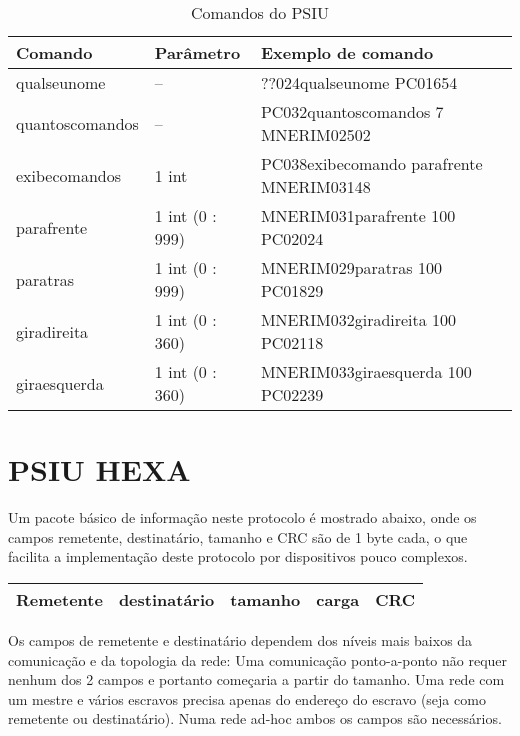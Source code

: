 \documentclass[11pt,	 papera4]{article}
\begin{document}
\begin{table}[h]
	\centering
	\caption{Comandos do PSIU}
	\begin{tabular}{p{3cm}p{2.5cm}p{9cm}}
		\toprule
		Comando &  Parâmetro & Exemplo de comando \\
		\midrule	
		qualseunome & -- & 	??024qualseunome PC01654\\	
		quantoscomandos & -- & PC032quantoscomandos 7 MNERIM02502  \\
		exibecomandos & 1 int & PC038exibecomando parafrente MNERIM03148\\
		parafrente & 1 int (0 : 999)  & MNERIM031parafrente 100 PC02024 \\
		paratras & 1 int (0 : 999)  & MNERIM029paratras 100 PC01829 \\
		giradireita & 1 int (0 : 360)  & MNERIM032giradireita 100 PC02118 \\
		giraesquerda & 1 int (0 : 360)  & MNERIM033giraesquerda 100 PC02239 \\
		\bottomrule
	\end{tabular}
	\label{tab:formatoslatex} %
\end{table}
	
\newpage

\part*{PSIU HEXA}


Um pacote básico de informação neste protocolo é mostrado abaixo, onde os campos remetente, destinatário, tamanho e CRC são de 1 byte cada, o que facilita a implementação deste protocolo por dispositivos pouco complexos.


\begin{center}
\begin{tabular}{lllll}
\hline
 Remetente  &  destinatário  &  tamanho  &  carga  &  CRC  \\
\hline
\end{tabular}
\end{center}



Os campos de remetente e destinatário dependem dos níveis mais baixos da comunicação e da topologia da rede: Uma comunicação ponto-a-ponto não requer nenhum dos 2 campos e portanto começaria a partir do tamanho. Uma rede com um mestre e vários escravos precisa apenas do endereço do escravo (seja como remetente ou destinatário). Numa rede ad-hoc ambos os campos são necessários.
\end{document}
